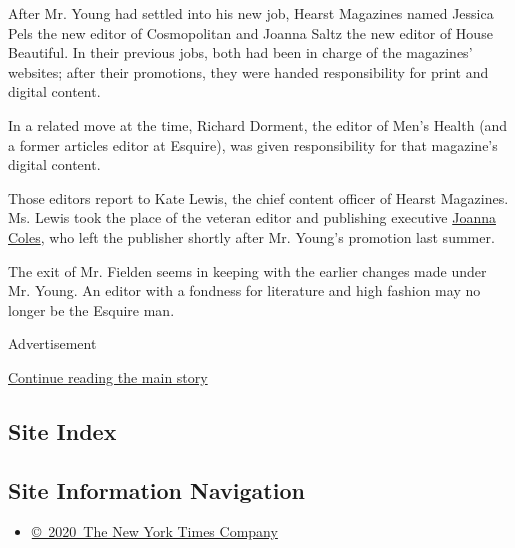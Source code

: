 After Mr. Young had settled into his new job, Hearst Magazines named
Jessica Pels the new editor of Cosmopolitan and Joanna Saltz the new
editor of House Beautiful. In their previous jobs, both had been in
charge of the magazines' websites; after their promotions, they were
handed responsibility for print and digital content.

In a related move at the time, Richard Dorment, the editor of Men's
Health (and a former articles editor at Esquire), was given
responsibility for that magazine's digital content.

Those editors report to Kate Lewis, the chief content officer of Hearst
Magazines. Ms. Lewis took the place of the veteran editor and publishing
executive
\href{https://www.nytimes3xbfgragh.onion/2018/08/06/business/media/joanna-coles-troy-young-hearst.html}{Joanna
Coles}, who left the publisher shortly after Mr. Young's promotion last
summer.

The exit of Mr. Fielden seems in keeping with the earlier changes made
under Mr. Young. An editor with a fondness for literature and high
fashion may no longer be the Esquire man.

Advertisement

\protect\hyperlink{after-bottom}{Continue reading the main story}

\hypertarget{site-index}{%
\subsection{Site Index}\label{site-index}}

\hypertarget{site-information-navigation}{%
\subsection{Site Information
Navigation}\label{site-information-navigation}}

\begin{itemize}
\tightlist
\item
  \href{https://help.nytimes3xbfgragh.onion/hc/en-us/articles/115014792127-Copyright-notice}{©~2020~The
  New York Times Company}
\end{itemize}


